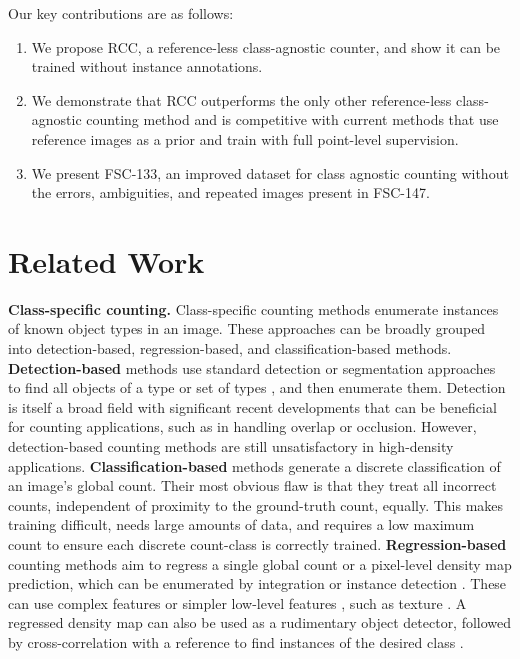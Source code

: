 \documentclass[letterpaper, 11pt]{IEEEtran}
\begin{document}
    Our key contributions are as follows:
    \begin{enumerate}
        \item We propose RCC, a reference-less class-agnostic counter, and show
        it can be trained without instance annotations.
        \item We demonstrate that RCC outperforms the only other reference-less class-agnostic counting method and is competitive with current methods that use reference images as a prior and train with full point-level supervision. 
        \item We present FSC-133, an improved dataset for class agnostic counting without the errors, ambiguities, and repeated images present in FSC-147.
    \end{enumerate}
\section{Related Work}
\label{relatedwork}

\textbf{Class-specific counting.}
Class-specific counting methods enumerate instances of known object types in an image. 
These approaches can be broadly grouped into detection-based, regression-based, and classification-based methods.
\textbf{Detection-based} methods use standard detection or segmentation approaches \cite{ren2015fasterrcnn, mundhenk2016large, michaelis2018one} to find all objects of a type \cite{hsieh2017drone} or set of types \cite{desai2011discriminative}, and then enumerate them. 
Detection is itself a broad field with significant recent developments that can be beneficial for counting applications, such as in handling overlap or occlusion. However, detection-based counting methods are still unsatisfactory in high-density applications.
\textbf{Classification-based} methods \cite{mundhenk2016large} generate a discrete classification of an image's global count.
Their most obvious flaw is that they treat all incorrect counts, independent of proximity to the ground-truth count, equally. This makes training difficult, needs large amounts of data, and requires a low maximum count to ensure each discrete count-class is correctly trained.
\textbf{Regression-based} counting methods aim to regress a single global count \cite{chan2009bayesian, wang2011automatic, wang2015deep} or a pixel-level density map prediction, which can be enumerated by integration \cite{cao2018scale, ranjan2021Famnet, xie2018microscopy} or instance detection \cite{barinova2012detection, arteta2014interactive, cholakkal2020towards}. These can use complex features \cite{zhang2015cross,zhang2016single} or simpler low-level features \cite{chan2009bayesian}, such as texture \cite{marana1997estimation}. 
A regressed density map can also be used as a rudimentary object detector, followed by cross-correlation with a reference to find instances of the desired class \cite{sokhandan2020few}.
\end{document}
